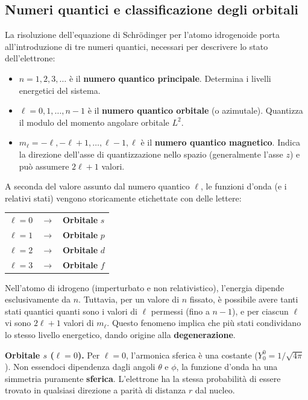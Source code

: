 \subsection{Numeri quantici e classificazione degli orbitali}
La risoluzione dell'equazione di Schrödinger per l'atomo idrogenoide porta all'introduzione di tre numeri quantici, necessari per descrivere lo stato dell'elettrone:
\begin{itemize}
    \item \(n = 1, 2, 3, \dots\) è il \textbf{numero quantico principale}. Determina i livelli energetici del sistema.
    \item \(\ell = 0, 1, \dots, n-1\) è il \textbf{numero quantico orbitale} (o azimutale). Quantizza il modulo del momento angolare orbitale \(L^2\).
    \item \(m_\ell = -\ell, -\ell+1, \dots, \ell-1, \ell\) è il \textbf{numero quantico magnetico}. Indica la direzione dell'asse di quantizzazione nello spazio (generalmente l'asse \(z\)) e può assumere \(2\ell+1\) valori.
\end{itemize}

A seconda del valore assunto dal numero quantico \(\ell\), le funzioni d'onda (e i relativi stati) vengono storicamente etichettate con delle lettere:
\begin{center}
    \begin{tabular}{ll}
        \(\ell = 0 \quad \longrightarrow\) & \textbf{Orbitale} \(s\) \\
        \(\ell = 1 \quad \longrightarrow\) & \textbf{Orbitale} \(p\) \\
        \(\ell = 2 \quad \longrightarrow\) & \textbf{Orbitale} \(d\) \\
        \(\ell = 3 \quad \longrightarrow\) & \textbf{Orbitale} \(f\)
    \end{tabular}
\end{center}

Nell'atomo di idrogeno (imperturbato e non relativistico), l'energia dipende esclusivamente da \(n\). 
Tuttavia, per un valore di \(n\) fissato, è possibile avere tanti stati quantici quanti sono i valori di \(\ell\) permessi (fino a \(n-1\)), 
e per ciascun \(\ell\) vi sono \(2\ell+1\) valori di \(m_\ell\). Questo fenomeno implica che più stati condividano lo stesso livello energetico, dando origine alla \textbf{degenerazione}.

\vspace{0.5em}
\textbf{Orbitale \(s\) (\(\ell=0\)).} Per \(\ell=0\), l'armonica sferica è una costante (\(Y_0^0 = 1/\sqrt{4\pi}\)). Non essendoci dipendenza dagli angoli \(\theta\) e \(\phi\), la funzione d'onda ha una simmetria puramente \textbf{sferica}. L'elettrone ha la stessa probabilità di essere trovato in qualsiasi direzione a parità di distanza \(r\) dal nucleo.

